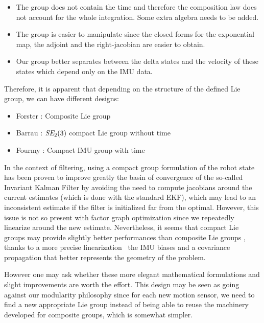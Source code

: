 \begin{itemize}
    \item The group does not contain the time and therefore the composition law does not account for the whole integration. Some extra algebra needs to be added.
    \item The group is easier to manipulate since the closed forms for the exponential map, the adjoint and the right-jacobian are easier to obtain.
    \item Our group better separates between the delta states and the velocity of these states which depend only on the IMU data.
\end{itemize}

Therefore, it is apparent that depending on the structure of the defined Lie group, we can have different designs:
\begin{itemize}
    \item Forster \cite{forster2015imu}: Composite Lie group
    \item Barrau \cite{barrau2020mathematical}: $\textit{SE}_2(3)$ compact Lie group without time
    \item Fourmy \cite{fourmy2019absolute}: Compact IMU group with time
\end{itemize}

In the context of filtering, using a compact group formulation of the robot state has been proven to improve greatly the basin of convergence of the so-called
Invariant Kalman Filter \cite{barrau2018invariant, hartley2020contact} by avoiding the need to compute jacobians around the current estimates (which is done
with the standard EKF), which may lead to an inconsistent estimate if the filter is initialized far from the optimal. 
However, this issue is not so present with factor graph optimization since we repeatedly linearize around the new estimate.
Nevertheless, it seems that compact Lie groups may provide slightly better performances than composite Lie groups \cite{brossard2021associating}, thanks 
to a more precise linearization \wrt\ the IMU biases and a covariance propagation that better represents the geometry of the problem.

However one may ask whether these more elegant mathematical formulations and slight improvements are worth the effort. This design may be seen as going against
our modularity philosophy since for each new motion sensor, we need to find a new appropriate Lie group instead of being able to reuse the machinery developed
for composite groups, which is somewhat simpler.

